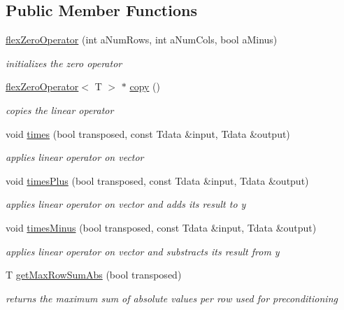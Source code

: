 \subsection*{Public Member Functions}
\begin{DoxyCompactItemize}
\item 
\hyperlink{classflex_zero_operator_a0d8f5246a460441e8ff71d6fe7359e23}{flex\+Zero\+Operator} (int a\+Num\+Rows, int a\+Num\+Cols, bool a\+Minus)
\begin{DoxyCompactList}\small\item\em initializes the zero operator \end{DoxyCompactList}\item 
\hyperlink{classflex_zero_operator}{flex\+Zero\+Operator}$<$ T $>$ $\ast$ \hyperlink{classflex_zero_operator_ab26ce548041980be572f7972907397af}{copy} ()
\begin{DoxyCompactList}\small\item\em copies the linear operator \end{DoxyCompactList}\item 
void \hyperlink{classflex_zero_operator_a3f512b2a67a803417d280e78418f8243}{times} (bool transposed, const Tdata \&input, Tdata \&output)
\begin{DoxyCompactList}\small\item\em applies linear operator on vector \end{DoxyCompactList}\item 
void \hyperlink{classflex_zero_operator_afad4cd5674474a1bc10224c99d72a65a}{times\+Plus} (bool transposed, const Tdata \&input, Tdata \&output)
\begin{DoxyCompactList}\small\item\em applies linear operator on vector and adds its result to y \end{DoxyCompactList}\item 
void \hyperlink{classflex_zero_operator_ae1b71503e1c6bf070deb080f2a0f1dd4}{times\+Minus} (bool transposed, const Tdata \&input, Tdata \&output)
\begin{DoxyCompactList}\small\item\em applies linear operator on vector and substracts its result from y \end{DoxyCompactList}\item 
T \hyperlink{classflex_zero_operator_a2c7b6c1cddc5a79c4d2948855a20b3f1}{get\+Max\+Row\+Sum\+Abs} (bool transposed)
\begin{DoxyCompactList}\small\item\em returns the maximum sum of absolute values per row used for preconditioning \end{DoxyCompactList}\item 

\end{DoxyCompactItemize}
